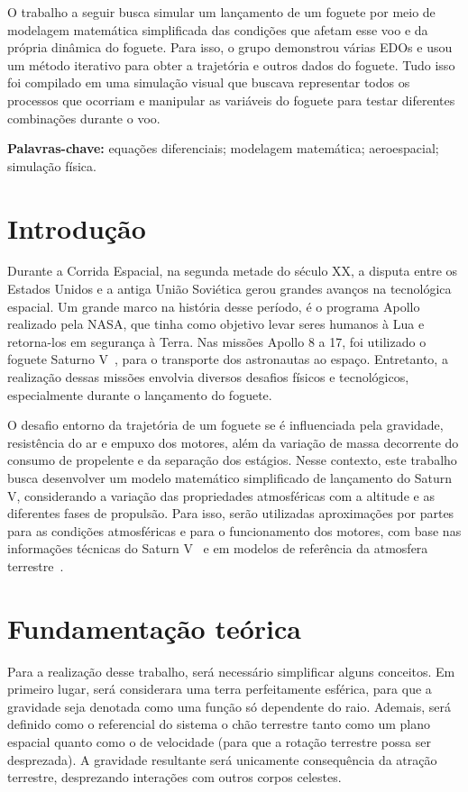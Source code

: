 \begin{resumo}
O trabalho a seguir busca simular um lançamento de um foguete por meio de modelagem matemática simplificada das condições que afetam esse voo e da própria dinâmica do foguete. Para isso, o grupo demonstrou várias EDOs e usou um método iterativo para obter a trajetória e outros dados do foguete. Tudo isso foi compilado em uma simulação visual que buscava representar todos os processos que ocorriam e manipular as variáveis do foguete para testar diferentes combinações durante o voo.
\end{resumo}

\noindent\textbf{Palavras-chave:} equações diferenciais; modelagem matemática; aeroespacial; simulação física.

\section{Introdução}
Durante a Corrida Espacial, na segunda metade do século XX, a disputa entre os Estados Unidos e a antiga União Soviética gerou grandes avanços na tecnológica espacial. Um grande marco na história desse período, é o programa Apollo realizado pela NASA, que tinha como objetivo levar seres humanos à Lua e retorna-los em segurança à Terra. Nas missões Apollo 8 a 17, foi utilizado o foguete Saturno V~\cite{nasa_saturnv_1969}, para o transporte dos astronautas ao espaço. Entretanto, a realização dessas missões envolvia diversos desafios físicos e tecnológicos, especialmente durante o lançamento do foguete.

O desafio entorno da trajetória de um foguete se é influenciada pela gravidade, resistência do ar e empuxo dos motores, além da variação de massa decorrente do consumo de propelente e da separação dos estágios. Nesse contexto, este trabalho busca desenvolver um modelo matemático simplificado de lançamento do Saturn V, considerando a variação das propriedades atmosféricas com a altitude e as diferentes fases de propulsão. Para isso, serão utilizadas aproximações por partes para as condições atmosféricas e para o funcionamento dos motores, com base nas informações técnicas do Saturn V~\cite{nasa_saturnv_1969} e em modelos de referência da atmosfera terrestre~\cite{USStandardAtmosphere1976}.

\section{Fundamentação teórica}

Para a realização desse trabalho, será necessário simplificar alguns conceitos. Em primeiro lugar, será considerara uma terra perfeitamente esférica, para que a gravidade seja denotada como uma função só dependente do raio. Ademais, será definido como o referencial do sistema o chão terrestre tanto como um plano espacial quanto como o de velocidade (para que a rotação terrestre possa ser desprezada). A gravidade resultante será unicamente consequência da atração terrestre, desprezando interações com outros corpos celestes.  

